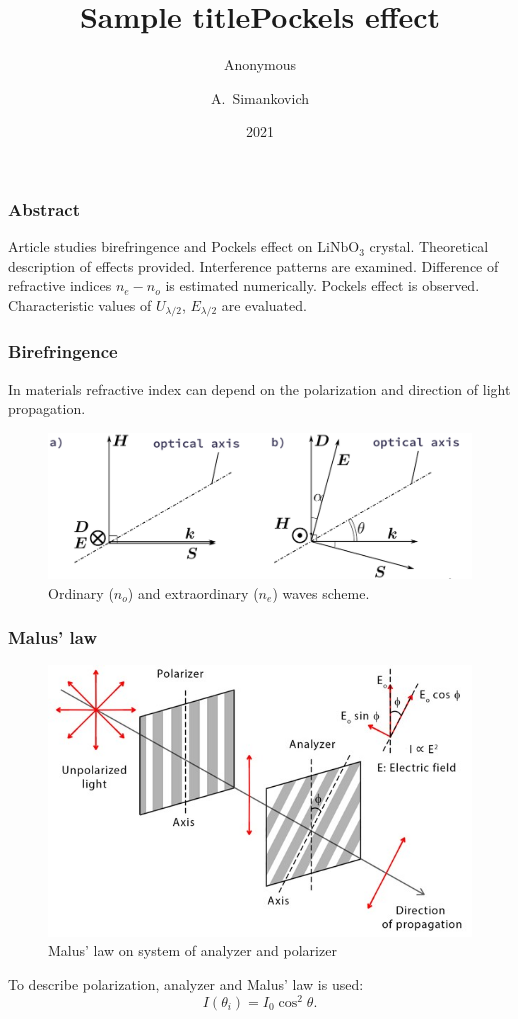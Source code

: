 \documentclass{beamer}
\title{Sample title}
\author{Anonymous}
\institute{Overleaf}
\date{2021}
\title[About Beamer] %
{Pockels effect}
\author[Arthur, Doe] %
{A.~Simankovich }
\institute[VFU] %
{
	Moscow Institute of Physics and Technology
}
\date[VLC 2023] %
\begin{document}
	
	\frame{\titlepage}
	
	\begin{frame}
		\frametitle{Abstract}
		
		Article studies birefringence and Pockels effect on $\text{LiNbO}_3$ crystal. Theoretical description of effects provided. Interference patterns are examined. Difference of refractive indices $n_e - n_o$ is estimated numerically. Pockels effect is observed. Characteristic values of $U_{\lambda/2}$, $E_{\lambda/2}$ are evaluated.
	\end{frame}
	
	\begin{frame}
		\frametitle{Birefringence}
		In materials refractive index can depend on the polarization and direction of light propagation.
		\begin{figure}
			\footnotesize
			\centering
			\includegraphics[width=\linewidth]{res/birefringence}
			\vspace{-5pt}
			\footnotesize
			\caption{\footnotesize Ordinary ($n_o$) and extraordinary ($n_e$) waves scheme.}
		\end{figure}		
	\end{frame}
	
	\begin{frame}
		\frametitle{Malus' law}

		\begin{figure}
			\centering
			\includegraphics[width=0.8\linewidth]{res/malus_law.jpg}
			\caption{Malus' law on system of analyzer and polarizer}
		\end{figure}

		To describe polarization, analyzer and Malus' law is used:
		$$
		I(\theta_i) = I_0 \cos^2{\theta}.
		\label{eq:malus}
		$$
	\end{frame}
\end{document}
